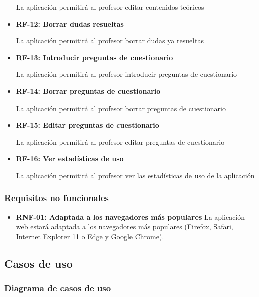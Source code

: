 \documentclass[openright,twoside,10pt]{book}
\providecommand{\tightlist}{%
  \setlength{\itemsep}{0pt}\setlength{\parskip}{0pt}}
\begin{document}
\begin{itemize}
      La aplicación permitirá al profesor editar contenidos teóricos
    \item
      \textbf{RF-12: Borrar dudas resueltas}
    
      La aplicación permitirá al profesor borrar dudas ya resueltas
    \item
      \textbf{RF-13: Introducir preguntas de cuestionario}
    
      La aplicación permitirá al profesor introducir preguntas de
      cuestionario
    \item
      \textbf{RF-14: Borrar preguntas de cuestionario}
    
      La aplicación permitirá al profesor borrar preguntas de cuestionario
    \item
      \textbf{RF-15: Editar preguntas de cuestionario}
    
      La aplicación permitirá al profesor editar preguntas de cuestionario
    \item
      \textbf{RF-16: Ver estadísticas de uso}
    
      La aplicación permitirá al profesor ver las estadísticas de uso de la
      aplicación
    \end{itemize}
    
    \subsubsection{Requisitos no
    funcionales}\label{requisitos-no-funcionales}
    
    \begin{itemize}
    \tightlist
    \item
      \textbf{RNF-01: Adaptada a los navegadores más populares} La
      aplicación web estará adaptada a los navegadores más populares
      (Firefox, Safari, Internet Explorer 11 o Edge y Google Chrome).
    \end{itemize}
    
    \subsection{Casos de uso}\label{casos-de-uso}
    
    \subsubsection{Diagrama de casos de uso}\label{diagrama-de-casos-de-uso}
    
\end{document}
